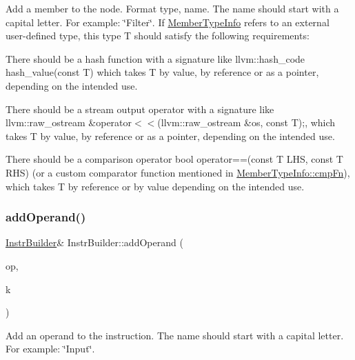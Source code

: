 Add a member to the node. Format type, name. The name should start with a capital letter. For example\+: \char`\"{}\+Filter\char`\"{}. If \hyperlink{struct_member_type_info}{Member\+Type\+Info} refers to an external user-\/defined type, this type T should satisfy the following requirements\+:
\begin{DoxyItemize}
\item There should be a hash function with a signature like {\ttfamily llvm\+::hash\+\_\+code hash\+\_\+value(const T)} which takes T by value, by reference or as a pointer, depending on the intended use.
\item There should be a stream output operator with a signature like {\ttfamily llvm\+::raw\+\_\+ostream \&operator$<$$<$(llvm\+::raw\+\_\+ostream \&os, const T);}, which takes T by value, by reference or as a pointer, depending on the intended use.
\item There should be a comparison operator {\ttfamily bool operator==(const T L\+HS, const T R\+HS)} (or a custom comparator function mentioned in \hyperlink{struct_member_type_info_abf6a66ee80b0f3680c6bd0b86d61a858}{Member\+Type\+Info\+::cmp\+Fn}), which takes T by reference or by value depending on the intended use. 
\end{DoxyItemize}\mbox{\label{class_instr_builder_a01a949625decce59e455c45a44ff6dc3}} 
\subsubsection{\texorpdfstring{add\+Operand()}{addOperand()}}
{\footnotesize\ttfamily \hyperlink{class_instr_builder}{Instr\+Builder}\& Instr\+Builder\+::add\+Operand (\begin{DoxyParamCaption}\item[{const std\+::string \&}]{op,  }\item[{Operand\+Kind}]{k }\end{DoxyParamCaption})\hspace{0.3cm}{\ttfamily [inline]}}

Add an operand to the instruction. The name should start with a capital letter. For example\+: \char`\"{}\+Input\char`\"{}. \mbox{\label{class_instr_builder_a69a849ba19e3bc7b6ec7edf64dc918a3}} 

